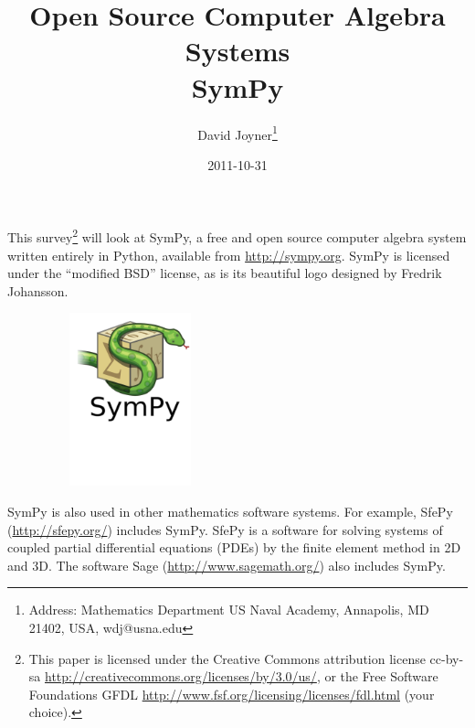 \documentclass[12pt]{article}
\begin{document}
\author{David Joyner\thanks{Address: Mathematics Department
US Naval Academy, Annapolis, MD 21402, USA, wdj@usna.edu}}
\title{{\small{Open Source Computer Algebra Systems}}\\ {\LARGE{SymPy}}}

\date{2011-10-31}

\maketitle




This survey\footnote{This paper is licensed under the
Creative Commons attribution license cc-by-sa
\url{http://creativecommons.org/licenses/by/3.0/us/},
or the Free Software Foundations GFDL
\url{http://www.fsf.org/licensing/licenses/fdl.html}
(your choice).} 
will look at SymPy, a free and open source computer algebra
system written entirely in Python, available from 
\url{http://sympy.org}.
SymPy is licensed under the ``modified BSD'' license, as is its
beautiful logo designed by Fredrik Johansson.

\begin{figure}[h!]
\begin{center}
\includegraphics[height=5cm,width=5cm]{sympy-snake-icon}
\end{center}
\end{figure}

SymPy is also used in other mathematics software systems.
For example, SfePy (\url{http://sfepy.org/})
includes SymPy. SfePy is a software for solving systems of coupled partial differential 
equations (PDEs) by the finite element method in 2D and 3D.
The software Sage (\url{http://www.sagemath.org/}) also includes SymPy.
\end{document}
